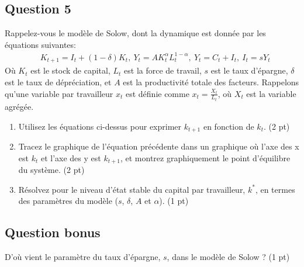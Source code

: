 \documentclass[11pt]{article}
\begin{document}
\subsection*{Question 5}
Rappelez-vous le modèle de Solow, dont la dynamique est donnée par les équations suivantes:
\begin{align}
    &K_{t+1} =I_t + (1-\delta)K_t,
    \ 
    Y_t = A K_t^{\alpha} L_t^{1-\alpha},
    \ Y_t = C_t + I_t,
    \ I_t = sY_t
\end{align}
Où \(K_t\) est le stock de capital, \(L_t\) est la force de travail, \(s\) est le taux d'épargne, \(\delta\) est le taux de dépréciation, et \(A\) 
est la productivité totale des facteurs. Rappelons qu'une variable par travailleur \(x_t\) est définie comme \(x_t = \frac{X_t}{L_t}\), 
où \(X_t\) est la variable agrégée.

\begin{enumerate}
    \item Utilisez les équations ci-dessus pour exprimer \(k_{t+1}\) en fonction de \(k_t\). (2 pt)
    \item Tracez le graphique de l'équation précédente dans un graphique où l'axe des x est \(k_t\) et l'axe des y est \(k_{t+1}\),
    et montrez graphiquement le point d'équilibre du système. (2 pt)
    \item Résolvez pour le niveau d'état stable du capital par travailleur, \(k^*\), en termes des paramètres du modèle
    (\(s\), \(\delta\), \(A\) et \(\alpha\)). (1 pt)
\end{enumerate}

\subsection*{Question bonus}
D'où vient le paramètre du taux d'épargne, \(s\), dans le modèle de Solow ? (1 pt)
\end{document}

